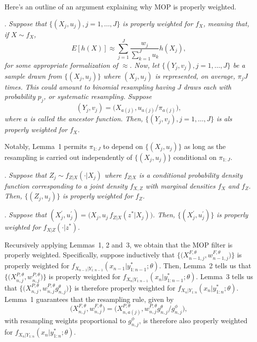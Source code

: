 \documentclass[12p]{article}
\begin{document}
Here's an outline of an argument explaining why MOP is properly weighted.

. {\it
Suppose that $\{(X_j,u_j),j=1,\dots,J\}$ is properly weighted for $f_X$, meaning that, if $X\sim f_X$,
\[
E[h(X)] \approx \sum_{j=1}^J \frac{w_j}{\sum_{k=1}^J u_k} h(X_j),
\]
for some appropriate formalization of $\approx$. Now, let $\{(Y_j,v_j),j=1,\dots,J\}$ be a sample drawn from $\{(X_j,u_j)\}$ where $(X_j,u_j)$ is represented, on average, $\pi_j J$ times. This could amount to binomial resampling having $J$ draws each with probability $p_j$, or systematic resampling. Suppose
\[
(Y_j,v_j) = \big(X_{a(j)},u_{a(j)}/\pi_{a(j)}\big),
\]
where $a$ is called the ancestor function. Then, $\{(Y_j,v_j),j=1,\dots,J\}$ is als properly weighted for $f_X$.
}

Notably, Lemma~1 permits $\pi_{1:J}$ to depend on $\{(X_j,u_j)\}$ as long as the resampling is carried out independently of $\{(X_j,u_j)\}$ conditional on $\pi_{1:J}$.

. {\it
  Suppose that $Z_j \sim f_{Z|X}(\cdot | X_j)$ where $f_{Z|X}$ is a conditional probability density function corresponding to a joint density $f_{X,Z}$ with marginal densities $f_X$ and $f_Z$. Then, $\{(Z_j,u_j)\}$ is properly weighted for $f_Z$.
}

. {\it
Suppose that $(X^\prime_j,u^\prime_j) = \big(X_j,u_j\, f_{Z|X}(z^*|X_j)\big)$. Then, $\{(X^\prime_j,u^\prime_j)\}$ is properly weighted for $f_{X|Z}(\cdot | z^*)$.
}

Recursively applying Lemmas~1, 2 and~3, we obtain that 
the MOP filter is properly weighted.
Specifically, suppose inductively that $\big\{\big(X^{F,\theta}_{n-1,j},w^{F,\theta}_{n-1,j}\big)\big\}$ is properly weighted for $f_{X_{n-1}|Y_{1:n-1}}(x_{n-1}|y^*_{1:n-1};\theta)$.
Then, Lemma~2 tells us that $\big\{\big(X^{P,\theta}_{n,j},w^{P,\theta}_{n,j}\big)\big\}$ is properly weighted for $f_{X_{n}|Y_{1:n-1}}(x_{n}|y^*_{1:n-1};\theta)$.
Lemma~3 tells us that $\big\{\big(X^{P,\theta}_{n,j},w^{P,\theta}_{n,j} g^\theta_{n,j} \big)\big\}$ is therefore properly weighted for  $f_{X_{n}|Y_{1:n}}(x_{n}|y^*_{1:n};\theta)$.
Lemma~1 guarantees that the resampling rule, given by 
\[
\big(X^{F,\theta}_{n,j},w^{F,\theta}_{n,j}\big) = \big(X^{P,\theta}_{n,a(j)}, w^{P,\theta}_{n,j} g^\theta_{n,j}\big/ g^\phi_{n,j}\big),
\]
with resampling weights proportional to $g^\phi_{n,j}$, is therefore also properly weighted for $f_{X_{n}|Y_{1:n}}(x_{n}|y^*_{1:n};\theta)$.
\end{document}
